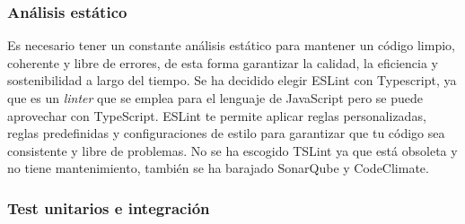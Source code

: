 \subsubsection*{Análisis estático}
Es necesario tener un constante análisis estático para mantener un código limpio, coherente y libre de errores, de esta forma garantizar la calidad, la eficiencia y sostenibilidad a largo
del tiempo. Se ha decidido elegir ESLint con Typescript, ya que es un \textit{linter} que se emplea para el lenguaje de JavaScript pero se puede aprovechar con TypeScript.
ESLint te permite aplicar reglas personalizadas, reglas predefinidas y configuraciones de estilo para garantizar que tu código sea consistente y libre de problemas.
No se ha escogido TSLint ya que está obsoleta y no tiene mantenimiento, también se ha barajado SonarQube y CodeClimate.

\subsubsection*{Test unitarios e integración}
